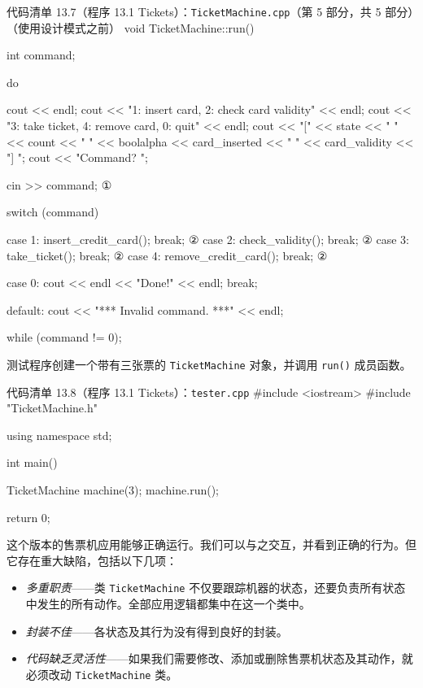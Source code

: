 \begin{codeboxt}{代码清单 13.7（程序 13.1 Tickets）：\texttt{Ticket\allowbreak{}Machine.\allowbreak{}cpp}（第 5 部分，共 5 部分）（使用设计模式之前）}
void TicketMachine::run()
{
    int command;

    do
    {
        cout << endl;
        cout << "1: insert card, 2: check card validity" << endl;
        cout << "3: take ticket, 4: remove card, 0: quit" << endl;
        cout << "[" << state << " " << count
             << " " << boolalpha << card_inserted
             << " " << card_validity << "] ";
        cout << "Command? ";

        cin >> command;                             ①

        switch (command)
        {
            case 1: insert_credit_card(); break;    ②
            case 2: check_validity();     break;    ②
            case 3: take_ticket();        break;    ②
            case 4: remove_credit_card(); break;    ②

            case 0: cout << endl << "Done!" << endl; break;

            default: cout << "*** Invalid command. ***" << endl;
        }
    } while (command != 0);
}
\end{codeboxt}
\par
{}\par

测试程序创建一个带有三张票的 \texttt{Ticket\allowbreak{}Machine} 对象，并调用 \texttt{run()} 成员函数。

\begin{codeboxt}{代码清单 13.8（程序 13.1 Tickets）：\texttt{tester.\allowbreak{}cpp}}
#include <iostream>
#include "TicketMachine.h"

using namespace std;

int main()
{
    TicketMachine machine(3);
    machine.run();

    return 0;
}
\end{codeboxt}


这个版本的售票机应用能够正确运行。我们可以与之交互，并看到正确的行为。但它存在重大缺陷，包括以下几项：

\begin{itemize}
\item \emph{多重职责}——类 \texttt{Ticket\allowbreak{}Machine} 不仅要跟踪机器的状态，还要负责所有状态中发生的所有动作。全部应用逻辑都集中在这一个类中。
\item \emph{封装不佳}——各状态及其行为没有得到良好的封装。
\item \emph{代码缺乏灵活性}——如果我们需要修改、添加或删除售票机状态及其动作，就必须改动 \texttt{Ticket\allowbreak{}Machine} 类。
\end{itemize}

